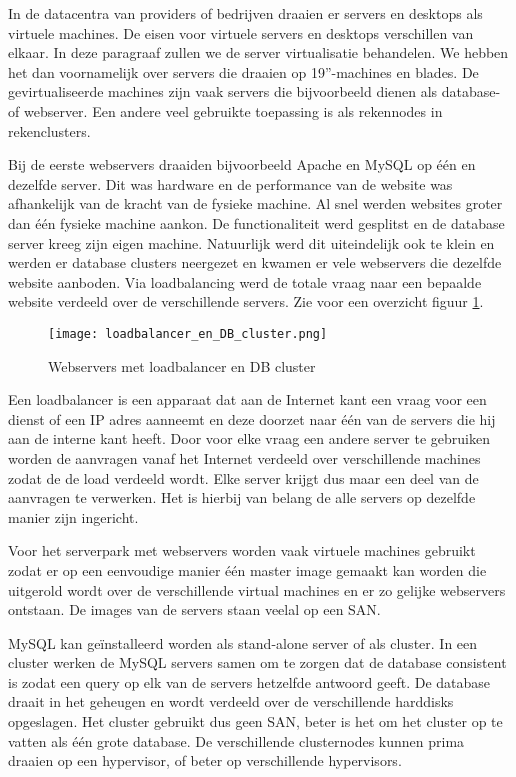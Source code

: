 In de datacentra van providers of bedrijven draaien er servers en desktops als virtuele machines. De eisen voor virtuele servers en desktops verschillen van elkaar. In deze paragraaf zullen we de server virtualisatie behandelen. We hebben het dan voornamelijk over servers die draaien op 19''-machines en blades. De gevirtualiseerde machines zijn vaak servers die bijvoorbeeld dienen als database- of webserver. Een andere veel gebruikte toepassing is als rekennodes in rekenclusters.

Bij de eerste webservers draaiden bijvoorbeeld Apache en MySQL op \'e\'en en dezelfde server. Dit was hardware en de performance van de website was afhankelijk van de kracht van de fysieke machine. Al snel werden websites groter dan \'e\'en fysieke machine aankon. De functionaliteit werd gesplitst en de database server kreeg zijn eigen machine. Natuurlijk werd dit uiteindelijk ook te klein en werden er database clusters neergezet en kwamen er vele webservers die dezelfde website aanboden. Via loadbalancing werd de totale vraag naar een bepaalde website verdeeld over de verschillende servers. Zie voor een overzicht figuur \ref{fig:WSDB-network}.

\begin{figure}[h!]
\texttt{[image: loadbalancer\_en\_DB\_cluster.png]}
\centering
\caption{Webservers met loadbalancer en DB cluster}
\label{fig:WSDB-network}
\end{figure}

Een loadbalancer is een apparaat dat aan de Internet kant een vraag voor een dienst of een IP adres aanneemt en deze doorzet naar \'e\'en van de servers die hij aan de interne kant heeft. Door voor elke vraag een andere server te gebruiken worden de aanvragen vanaf het Internet verdeeld over verschillende machines zodat de de load verdeeld wordt. Elke server krijgt dus maar een deel van de aanvragen te verwerken. Het is hierbij van belang de alle servers op dezelfde manier zijn ingericht.

Voor het serverpark met webservers worden vaak virtuele machines gebruikt zodat er op een eenvoudige manier \'e\'en master image gemaakt kan worden die uitgerold wordt over de verschillende virtual machines en er zo gelijke webservers ontstaan. De images van de servers staan veelal op een SAN.

MySQL kan ge\"installeerd worden als stand-alone server of als cluster. In een cluster werken de MySQL servers samen om te zorgen dat de database consistent is zodat een query op elk van de servers hetzelfde antwoord geeft. De database draait in het geheugen en wordt verdeeld over de verschillende harddisks opgeslagen. Het cluster gebruikt dus geen SAN, beter is het om het cluster op te vatten als \'e\'en grote database. De verschillende clusternodes kunnen prima draaien op een hypervisor, of beter op verschillende hypervisors.
